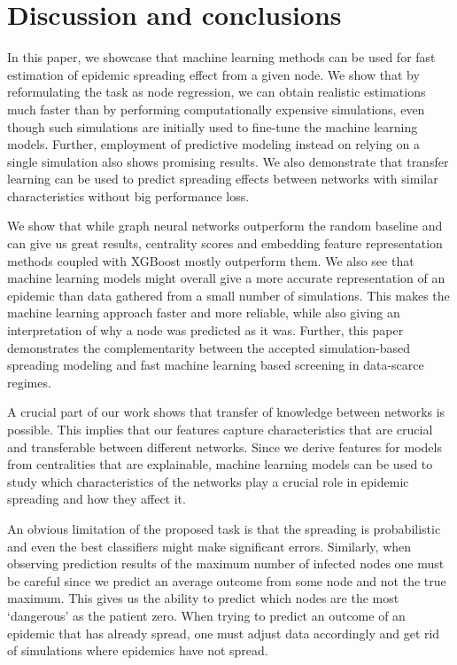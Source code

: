 \documentclass{article}
\begin{document}
\section{Discussion and conclusions}
\label{sec:discussion-conclusion}
In this paper, we showcase that machine learning methods can be used for fast estimation of epidemic spreading effect from a given node. We show that by reformulating the task as node regression, we can obtain realistic estimations much faster than by performing computationally expensive simulations, even though such simulations are initially used to fine-tune the machine learning models. Further, employment of predictive modeling instead on relying on a single simulation also shows promising results. We also demonstrate that transfer learning can be used to predict spreading effects between networks with similar characteristics without big performance loss.

We show that while graph neural networks outperform the random baseline and can give us great results, centrality scores and embedding feature representation methods coupled with XGBoost mostly outperform them. We also see that machine learning models might overall give a more accurate representation of an epidemic than data gathered from a small number of simulations. This makes the machine learning approach faster and more reliable, while also giving an interpretation of why a node was predicted as it was. Further, this paper demonstrates the complementarity between the accepted simulation-based spreading modeling and  fast machine learning based screening in data-scarce regimes.

A crucial part of our work shows that transfer of knowledge between networks is possible. This implies that our features capture characteristics that are crucial and transferable between different networks. Since we derive features for models from centralities that are explainable, machine learning models can be used to study which characteristics of the networks play a crucial role in epidemic spreading and how they affect it.

An obvious limitation of the proposed task is that the spreading is probabilistic and even the best classifiers might make significant errors. Similarly, when observing prediction results of the maximum number of infected nodes one must be careful since we predict an average outcome from some node and not the true maximum. This gives us the ability to predict which nodes are the most `dangerous' as the patient zero. When trying to predict an outcome of an epidemic that has already spread, one must adjust data accordingly and get rid of simulations where epidemics have not spread.
\end{document}
